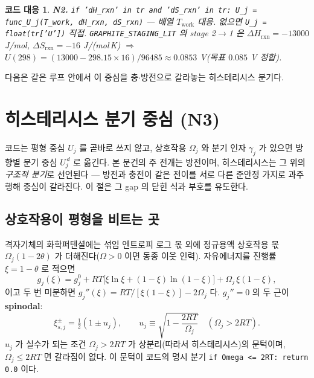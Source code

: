 \documentclass[11pt,a4paper]{article}
\newtheorem*{codebox}{코드 대응}
\newcommand{\rxn}{\mathrm{rxn}}
\newcommand{\work}{\mathrm{work}}
\newcommand{\code}[1]{\texttt{#1}}
\begin{document}
\begin{codebox}
\textbf{N2.} \code{if 'dH\_rxn' in tr and 'dS\_rxn' in tr: U\_j = func\_U\_j(T\_work, dH\_rxn, dS\_rxn)}
— 배열 $T_\work$ 대응. 없으면 \code{U\_j = float(tr['U'])} 직접. \code{GRAPHITE\_STAGING\_LIT} 의 stage 2$\to$1 은
$\Delta H_\rxn=-13000$ J/mol, $\Delta S_\rxn=-16$ J/(mol\,K) $\Rightarrow$ $U(298)=(13000-298.15\times16)/96485
\approx0.0853$ V(목표 $0.085$ V 정합).
\end{codebox}

다음은 같은 루프 안에서 이 중심을 충$\cdot$방전으로 갈라놓는 히스테리시스 분기다.

\section{히스테리시스 분기 중심 (N3)}\label{sec:hys}
코드는 평형 중심 $U_j$ 를 곧바로 쓰지 않고, 상호작용 $\Omega_j$ 와 분기 인자 $\gamma_j$ 가 있으면 방향별 분기 중심
$U_j^{\,d}$ 로 옮긴다. 본 문건의 주 전개는 방전이며, 히스테리시스는 그 위의 \emph{구조적 분기}로 선언된다 — 방전과 충전이
같은 전이를 서로 다른 준안정 가지로 과주행해 중심이 갈라진다. 이 절은 그 gap 의 닫힌 식과 부호를 유도한다.

\subsection{상호작용이 평형을 비트는 곳}
격자기체의 화학퍼텐셜에는 섞임 엔트로피 로그 몫 외에 정규용액 상호작용 몫 $\Omega_j(1-2\theta)$ 가 더해진다($\Omega>0$
이면 동종 이웃 인력). 자유에너지를 진행률 $\xi=1-\theta$ 로 적으면
\begin{equation}
g_j(\xi)=g_j^0+RT\big[\xi\ln\xi+(1-\xi)\ln(1-\xi)\big]+\Omega_j\,\xi(1-\xi),
\label{eq:gxi}
\end{equation}
이고 두 번 미분하면 $g_j''(\xi)=RT/[\xi(1-\xi)]-2\Omega_j$ 다. $g_j''=0$ 의 두 근이 \textbf{spinodal}:
\begin{equation}
\xi_{s,j}^\pm=\tfrac12(1\pm u_j),\qquad
u_j\equiv\sqrt{1-\frac{2RT}{\Omega_j}}\quad(\Omega_j>2RT).
\label{eq:spinodal}
\end{equation}
$u_j$ 가 실수가 되는 조건 $\Omega_j>2RT$ 가 상분리(따라서 히스테리시스)의 문턱이며, $\Omega_j\le2RT$ 면 갈라짐이 없다.
이 문턱이 코드의 명시 분기 \code{if Omega <= 2RT: return 0.0} 이다.
\end{document}

